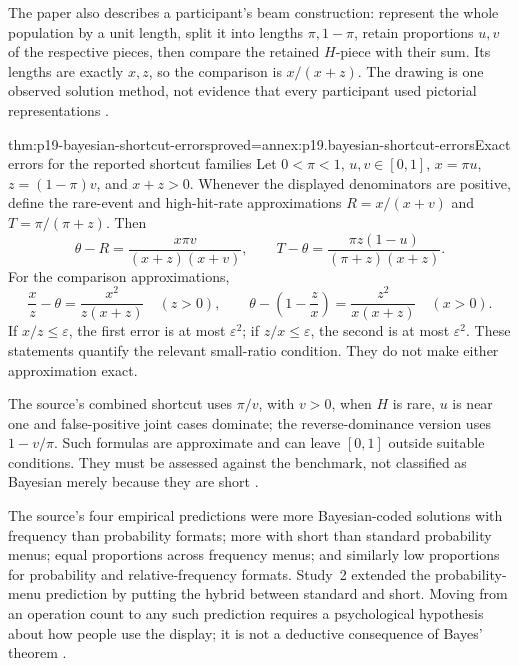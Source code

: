The paper also describes a participant's beam construction: represent the
whole population by a unit length, split it into lengths \(\pi,1-\pi\),
retain proportions \(u,v\) of the respective pieces, then compare the
retained \(H\)-piece with their sum. Its lengths are exactly \(x,z\),
so the comparison is \(x/(x+z)\). The drawing is one observed solution
method, not evidence that every participant used pictorial representations
\cite[pp.~689--690, Fig.~2]{GigerenzerHoffrage1995FrequencyFormats}.

\begin{hblemma}{thm:p19-bayesian-shortcut-errors}{proved=annex:p19.bayesian-shortcut-errors}{Exact errors for the reported shortcut families}
Let \(0<\pi<1\), \(u,v\in[0,1]\), \(x=\pi u\),
\(z=(1-\pi)v\), and \(x+z>0\). Whenever the displayed denominators
are positive, define the rare-event and high-hit-rate approximations
\(R=x/(x+v)\) and \(T=\pi/(\pi+z)\). Then
\[
 \theta-R=\frac{x\pi v}{(x+z)(x+v)},\qquad
 T-\theta=\frac{\pi z(1-u)}{(\pi+z)(x+z)}.
\]
For the comparison approximations,
\[
 \frac{x}{z}-\theta=\frac{x^2}{z(x+z)}\quad(z>0),\qquad
 \theta-\left(1-\frac{z}{x}\right)=\frac{z^2}{x(x+z)}\quad(x>0).
\]
If \(x/z\leq\varepsilon\), the first error is at most
\(\varepsilon^2\); if \(z/x\leq\varepsilon\), the second is at most
\(\varepsilon^2\). These statements quantify the relevant small-ratio
condition. They do not make either approximation exact.
\end{hblemma}

The source's combined shortcut uses \(\pi/v\), with \(v>0\), when \(H\) is rare, \(u\)
is near one and false-positive joint cases dominate; the reverse-dominance
version uses \(1-v/\pi\). Such formulas are approximate and can leave
\([0,1]\) outside suitable conditions. They must be assessed against the
benchmark, not classified as Bayesian merely because they are short
\cite[pp.~690--691]{GigerenzerHoffrage1995FrequencyFormats}.

The source's four empirical predictions were more Bayesian-coded solutions
with frequency than probability formats; more with short than standard
probability menus; equal proportions across frequency menus; and similarly
low proportions for probability and relative-frequency formats. Study~2
extended the probability-menu prediction by putting the hybrid between
standard and short. Moving from an operation count to any such prediction
requires a psychological hypothesis about how people use the display; it
is not a deductive consequence of Bayes' theorem
\cite[pp.~691--692, 695]{GigerenzerHoffrage1995FrequencyFormats}.

